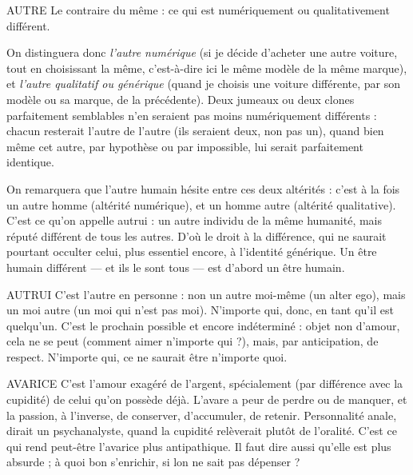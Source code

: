 AUTRE Le contraire du même : ce qui est numériquement ou qualitativement différent.

On distinguera donc {\it l'autre numérique} (si je décide d’acheter une autre voiture,
tout en choisissant la même, c’est-à-dire ici le même modèle de la même
marque), et {\it l'autre qualitatif ou générique} (quand je choisis une voiture différente,
par son modèle ou sa marque, de la précédente). Deux jumeaux ou deux
clones parfaitement semblables n’en seraient pas moins numériquement
différents : chacun resterait l’autre de l’autre (ils seraient deux, non pas un),
quand bien même cet autre, par hypothèse ou par impossible, lui serait parfaitement
identique.

On remarquera que l’autre humain hésite entre ces deux altérités : c’est à
la fois un autre homme (altérité numérique), et un homme autre (altérité
qualitative). C’est ce qu’on appelle autrui : un autre individu de la même
humanité, mais réputé différent de tous les autres. D’où le droit à la différence,
qui ne saurait pourtant occulter celui, plus essentiel encore, à l’identité
générique. Un être humain différent — et ils le sont tous — est d’abord un être
humain.

AUTRUI C'est l’autre en personne : non un autre moi-même (un alter ego),
mais un moi autre (un moi qui n’est pas moi). N’importe qui,
donc, en tant qu’il est quelqu'un.
C’est le prochain possible et encore indéterminé : objet non d’amour, cela
ne se peut (comment aimer n’importe qui ?), mais, par anticipation, de respect.
N'importe qui, ce ne saurait être n’importe quoi.

AVARICE C'est l’amour exagéré de l’argent, spécialement (par différence
avec la cupidité) de celui qu’on possède déjà. L’avare a peur de
perdre ou de manquer, et la passion, à l'inverse, de conserver, d’accumuler, de
retenir. Personnalité anale, dirait un psychanalyste, quand la cupidité relèverait
plutôt de l’oralité. C’est ce qui rend peut-être l’avarice plus antipathique. Il faut
dire aussi qu’elle est plus absurde ; à quoi bon s'enrichir, si lon ne sait pas
dépenser ?

